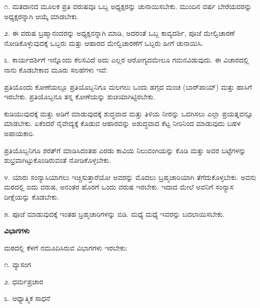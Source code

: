 ೧. ಮತದಾನದ ಮೂಲಕ ಪ್ರತಿ ವರುಷವೂ ಒಬ್ಬ ಅಧ್ಯಕ್ಷರನ್ನು ಚುನಾಯಿಸಬೇಕು. ಮುಂದಿನ ವರ್ಷ ಬೇರೆಯವರನ್ನು ಅಧ್ಯಕ್ಷರನ್ನಾಗಿ ಆಯ್ಕೆ ಮಾಡಬೇಕು.
\vspace{0.2cm}

೨. ಈ ವರುಷ ಬ್ರಹ್ಮಾನಂದರನ್ನು ಅಧ್ಯಕ್ಷನನ್ನಾಗಿ ಮಾಡಿ, ಅದರಂತೆ ಒಬ್ಬ ಕಾವ್ಯದರ್ಶಿ, ಪೂಜೆ ಮೇಲ್ವಿಚಾರಣೆ ನೋಡಿಕೊಳ್ಳುವುದಕ್ಕೆ ಒಬ್ಬರು ಮತ್ತು ಆಹಾರದ ಮೇಲ್ವಿಚಾರಣೆಗೆ ಒಬ್ಬರು\enginline{-} ಹೀಗೆ ಚುನಾಯಿಸಿ.
\vspace{0.2cm}

೩. ಕಾರ್ಯದರ್ಶಿಗೆ ಇನ್ನೊಂದು ಕೆಲಸವಿದೆ ಅದು ಎಲ್ಲರ ಆರೋಗ್ಯದಮೇಲೂ ಗಮನವಿಡುವುದು. ಈ ವಿಚಾರದಲ್ಲಿ ನಾನು ಕೊಡಬೇಕಾದ ಮೂರು ಸಲಹೆಗಳು ಇವೆ:
\vspace{0.2cm}

 ಪ್ರತಿಯೊಂದು ಕೋಣೆಯಲ್ಲೂ ಪ್ರತಿಯೊಬ್ಬನಿಗೂ ಮಲಗಲು ಒಂದು ಹಗ್ಗದ ಮಂಚ (ಬಾರ್‌ಪಾಯ್) ಮತ್ತು ಹಾಸಿಗೆ ಇರಬೇಕು. ಪ್ರತಿಯೊಬ್ಬನೂ ತನ್ನ ಕೋಣೆಯನ್ನು ಶುಚಿಯಾಗಿಟ್ಟಿರಬೇಕು.
\vspace{0.3cm}

 ಕುಡಿಯುವುದಕ್ಕೆ ಮತ್ತು ಅಡಿಗೆ ಮಾಡುವುದಕ್ಕೆ ಶುದ್ಧವಾದ ಮತ್ತು ತಿಳಿಯ ನೀರನ್ನು ಒದಗಿಸಲು ಎಲ್ಲಾ ಪ್ರಯತ್ನವನ್ನೂ ಮಾಡಬೇಕು. ಏಕೆಂದರೆ ನೈವೇದ್ಯಕ್ಕೆ ಕೊಡುವ ಆಹಾರವನ್ನು ಅಶುದ್ಧವಾದ ಕೆಟ್ಟ ನೀರಿನಿಂದ ಮಾಡುವುದು ಬಹಳ ಅಪಾಯಕಾರಿ.
\vspace{0.3cm}

 ಪ್ರತಿಯೊಬ್ಬನಿಗೂ ಶರತ್‌ಗೆ ಮಾಡಿಸಿದಂತಹ ಎರಡು ಕಾವಿಯ ನಿಲುವಂಗಿಯನ್ನು ಕೊಡಿ ಮತ್ತು ಅವರ ಬಟ್ಟೆಗಳನ್ನು ಶುಭ್ರವಾಗಿಟ್ಟುಕೊಂಡಿರುವಂತೆ ನೋಡಿಕೊಳ್ಳಬೇಕು.
\vspace{0.3cm}

೪. ಯಾರು ಸಂನ್ಯಾಸಿಯಾಗಲು ಇಚ್ಚಿಸುತ್ತಾರೆಯೋ ಅವರನ್ನು ಮೊದಲು ಬ್ರಹ್ಮಚಾರಿಯಾಗಿ ತೆಗೆದುಕೊಳ್ಳಬೇಕು. ಅವನು ಮಠದಲ್ಲಿ ಐದು ವರುಷ, ಅನಂತರ ಹೊರಗೆ ಒಂದು ವರುಷ ಇರಬೇಕು. ಇದಾದ ಮೇಲೆ ಅವನಿಗೆ ಸಂನ್ಯಾಸ ದೀಕ್ಷೆಯನ್ನು ಕೊಡಬೇಕು.
\vspace{0.2cm}

೫. ಪೂಜೆ ಮಾಡುವುದಕ್ಕೆ ಇಂತಹ ಬ್ರಹ್ಮಚಾರಿಗಳನ್ನು ಬಿಡಿ. ಮಧ್ಯೆ ಮಧ್ಯೆ ಇವರನ್ನು ಬದಲಾಯಿಸಬೇಕು.

\begin{center}
\textbf{ವಿಭಾಗಗಳು}
\end{center}

ಮಠದಲ್ಲಿ ಕೆಳಗೆ ನಮೂದಿಸಿರುವ ವಿಭಾಗಗಳು ಇರಬೇಕು:

\vspace{0.15cm}

೧. ವ್ಯಾಸಂಗ

\vspace{0.13cm}

೨. ಧರ್ಮಪ್ರಚಾರ

\vspace{0.13cm}

೩. ಆಧ್ಯಾತ್ಮಿಕ ಸಾಧನೆ
\vspace{0.3cm}

